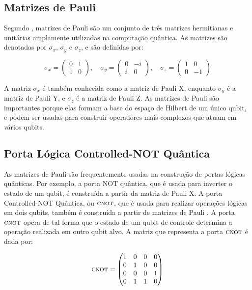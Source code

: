 \subsection{Matrizes de Pauli}\label{sec:pauli}

Segundo \textcite{chuang}, matrizes de Pauli são um conjunto de três matrizes hermitianas e unitárias amplamente utilizadas na computação quântica. As matrizes são denotadas por $\sigma_x$, $\sigma_y$ e $\sigma_z$, e são definidas por:

\begin{equation}
\sigma_x=\left(\begin{array}{cc}
0 & 1 \\
1 & 0
\end{array}\right), \quad \sigma_y=\left(\begin{array}{cc}
0 & -i \\
i & 0
\end{array}\right), \quad \sigma_z=\left(\begin{array}{cc}
1 & 0 \\
0 & -1
\end{array}\right)
\end{equation}

A matriz $\sigma_x$ é também conhecida como a matriz de Pauli X, enquanto $\sigma_y$ é a matriz de Pauli Y, e $\sigma_z$ é a matriz de Pauli Z. As matrizes de Pauli são importantes porque elas formam a base do espaço de Hilbert de um único qubit, e podem ser usadas para construir operadores mais complexos que atuam em vários qubits.

\subsection{Porta Lógica Controlled-NOT Quântica}\label{sec:cnot}
As matrizes de Pauli são frequentemente usadas na construção de portas lógicas quânticas. Por exemplo, a porta NOT quântica, que é usada para inverter o estado de um qubit, é construída a partir da matriz de Pauli X. A porta Controlled-NOT Quântica, ou \(\operatorname{\textsc{cnot}}\), que é usada para realizar operações lógicas em dois qubits, também é construída a partir de matrizes de Pauli \cite{CompInfoQuantica}. 
A porta \(\operatorname{\textsc{cnot}}\) opera de tal forma que o estado de um qubit de controle determina a operação realizada em outro qubit alvo. A matriz que representa a porta \(\operatorname{\textsc{cnot}}\) é dada por:

\begin{equation}
\operatorname{\textsc{cnot}} = \begin{pmatrix}
1 & 0 & 0 & 0 \\
0 & 1 & 0 & 0 \\
0 & 0 & 0 & 1 \\
0 & 1 & 1 & 0
\end{pmatrix} 
\end{equation}


